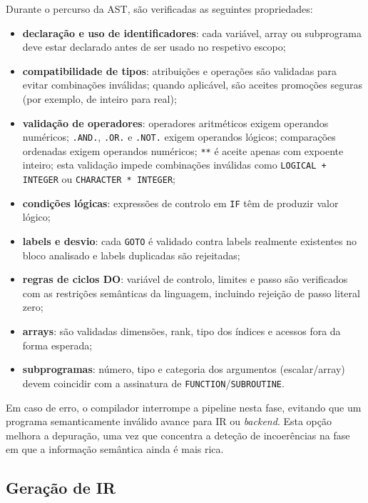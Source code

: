 \documentclass{article}
\begin{document}
Durante o percurso da AST, são verificadas as seguintes propriedades:

\begin{itemize}
\item \textbf{declaração e uso de identificadores}: cada variável, array ou subprograma deve
estar declarado antes de ser usado no respetivo escopo;
\item \textbf{compatibilidade de tipos}: atribuições e operações são validadas para evitar
combinações inválidas; quando aplicável, são aceites promoções seguras (por exemplo, de
inteiro para real);
\item \textbf{validação de operadores}: operadores aritméticos exigem operandos numéricos;
\texttt{.AND.}, \texttt{.OR.} e \texttt{.NOT.} exigem operandos lógicos; comparações
ordenadas exigem operandos numéricos; \texttt{**} é aceite apenas com expoente inteiro; esta
validação impede combinações inválidas como \texttt{LOGICAL + INTEGER} ou
\texttt{CHARACTER * INTEGER};
\item \textbf{condições lógicas}: expressões de controlo em \texttt{IF} têm de produzir
valor lógico;
\item \textbf{labels e desvio}: cada \texttt{GOTO} é validado contra labels realmente
existentes no bloco analisado e labels duplicadas são rejeitadas;
\item \textbf{regras de ciclos DO}: variável de controlo, limites e passo são verificados com
as restrições semânticas da linguagem, incluindo rejeição de passo literal zero;
\item \textbf{arrays}: são validadas dimensões, rank, tipo dos índices e acessos fora da forma
esperada;
\item \textbf{subprogramas}: número, tipo e categoria dos argumentos (escalar/array) devem
coincidir com a assinatura de \texttt{FUNCTION}/\texttt{SUBROUTINE}.
\end{itemize}

Em caso de erro, o compilador interrompe a pipeline nesta fase, evitando que um programa
semanticamente inválido avance para IR ou \textit{backend}. Esta opção melhora a depuração,
uma vez que concentra a deteção de incoerências na fase em que a informação semântica ainda
é mais rica.

\subsection{Geração de IR}
\end{document}
